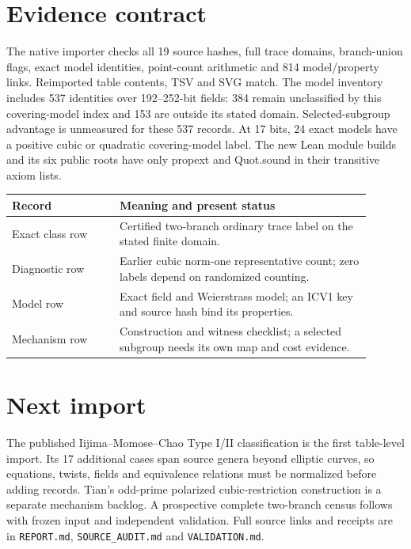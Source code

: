 \documentclass[10pt]{article}
\begin{document}
\section*{Evidence contract}
The native importer checks all 19 source hashes, full trace domains,
branch-union flags, exact model identities, point-count arithmetic and
814 model/property links. Reimported table contents, TSV and SVG match.
The model inventory includes 537 identities over 192--252-bit fields:
384 remain unclassified by this covering-model index and 153 are outside
its stated domain. Selected-subgroup advantage is unmeasured for these
537 records. At 17 bits, 24 exact models have a positive cubic or
quadratic covering-model label.
The new Lean module builds and its six public roots have only
propext and Quot.sound in their transitive axiom lists.

\begin{center}
\begin{tabular}{@{}p{0.27\linewidth}p{0.63\linewidth}@{}}
\toprule
Record & Meaning and present status\\
\midrule
Exact class row & Certified two-branch ordinary trace label on the stated finite domain.\\
Diagnostic row & Earlier cubic norm-one representative count; zero labels depend on randomized counting.\\
Model row & Exact field and Weierstrass model; an ICV1 key and source hash bind its properties.\\
Mechanism row & Construction and witness checklist; a selected subgroup needs its own map and cost evidence.\\
\bottomrule
\end{tabular}
\end{center}

\section*{Next import}
The published Iijima--Momose--Chao Type I/II classification is the
first table-level import. Its 17 additional cases span source genera
beyond elliptic curves, so equations, twists, fields and equivalence
relations must be normalized before adding records. Tian's odd-prime
polarized cubic-restriction construction is a separate mechanism
backlog. A prospective complete two-branch census follows with
frozen input and independent validation. Full source links and
receipts are in \texttt{REPORT.md}, \texttt{SOURCE\_AUDIT.md} and
\texttt{VALIDATION.md}.
\end{document}
